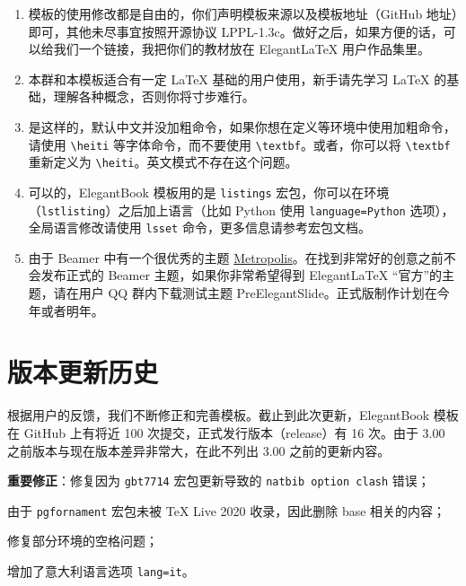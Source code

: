 \documentclass[cn,11pt]{elegantbook}
\begin{document}
\begin{enumerate}[itemsep=1.5ex]
  \item {}
    模板的使用修改都是自由的，你们声明模板来源以及模板地址（GitHub 地址）即可，其他未尽事宜按照开源协议 LPPL-1.3c。做好之后，如果方便的话，可以给我们一个链接，我把你们的教材放在 Elegant\LaTeX{} 用户作品集里。
  \item {}
    本群和本模板适合有一定 \LaTeX{} 基础的用户使用，新手请先学习 \LaTeX{} 的基础，理解各种概念，否则你将寸步难行。
  \item {}
    是这样的，默认中文并没加粗命令，如果你想在定义等环境中使用加粗命令，请使用 \lstinline{\heiti} 等字体命令，而不要使用 \lstinline{\textbf}。或者，你可以将 \lstinline|\textbf| 重新定义为 \lstinline|\heiti|。英文模式不存在这个问题。
  \item {}
    可以的，ElegantBook 模板用的是 \lstinline{listings} 宏包，你可以在环境（\lstinline{lstlisting}）之后加上语言（比如 Python 使用 \lstinline{language=Python} 选项），全局语言修改请使用 \lstinline{lsset} 命令，更多信息请参考宏包文档。
  \item {}
    由于 Beamer 中有一个很优秀的主题 \href{https://github.com/matze/mtheme}{Metropolis}。在找到非常好的创意之前不会发布正式的 Beamer 主题，如果你非常希望得到 Elegant\LaTeX{} “官方”的主题，请在用户 QQ 群内下载测试主题 PreElegantSlide。正式版制作计划在今年或者明年。
\end{enumerate}

\chapter{版本更新历史}

根据用户的反馈，我们不断修正和完善模板。截止到此次更新，ElegantBook 模板在 GitHub 上有将近 100 次提交，正式发行版本（release）有 16 次。由于 3.00 之前版本与现在版本差异非常大，在此不列出 3.00 之前的更新内容。


\begin{change}
  \item \textbf{重要修正}：修复因为 \lstinline{gbt7714} 宏包更新导致的 \lstinline{natbib option clash} 错误；
  \item 由于 \lstinline{pgfornament} 宏包未被 \TeX{} Live 2020 收录，因此删除 base 相关的内容；
  \item 修复部分环境的空格问题；
  \item 增加了意大利语言选项 \lstinline{lang=it}。
\end{change}
\end{document}
